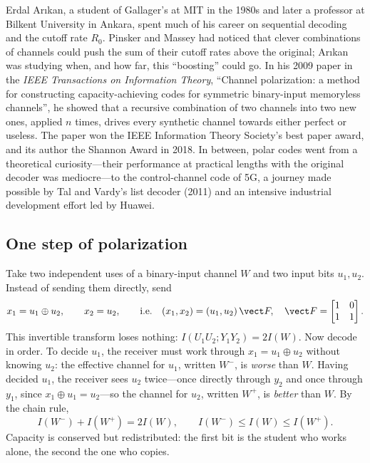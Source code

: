 \begin{history}
Erdal Ar\i kan, a student of Gallager's at MIT in the 1980s and later a professor at Bilkent
University in Ankara, spent much of his career on sequential decoding and the cutoff rate $R_0$.
Pinsker and Massey had noticed that clever combinations of channels could push the sum of their
cutoff rates above the original; Ar\i kan was studying when, and how far, this ``boosting'' could
go. In his 2009 paper in the \emph{IEEE Transactions on Information Theory}, ``Channel polarization:
a method for constructing capacity-achieving codes for symmetric binary-input memoryless channels'',
he showed that a recursive combination of two channels into two new ones, applied $n$ times, drives
every synthetic channel towards either perfect or useless. The paper won the IEEE Information Theory
Society's best paper award, and its author the Shannon Award in 2018. In between, polar codes went
from a theoretical curiosity---their performance at practical lengths with the original decoder was
mediocre---to the control-channel code of 5G, a journey made possible by Tal and Vardy's list
decoder (2011) and an intensive industrial development effort led by Huawei.
\end{history}

\subsection{One step of polarization}


Take two independent uses of a binary-input channel $W$ and two input bits $u_1,u_2$. Instead of
sending them directly, send
\begin{equation}
x_1=u_1\oplus u_2,\qquad x_2=u_2,
\qquad\text{i.e.}\quad (x_1,x_2)=(u_1,u_2)\,\vect F,\quad
\vect F=\begin{bmatrix}1&0\\1&1\end{bmatrix}.
\label{eq:ch15:F}
\end{equation}
This invertible transform loses nothing: $I(U_1U_2;Y_1Y_2)=2I(W)$. Now decode in order. To decide
$u_1$, the receiver must work through $x_1=u_1\oplus u_2$ without knowing $u_2$: the effective channel
for $u_1$, written $W^-$, is \emph{worse} than $W$. Having decided $u_1$, the receiver sees $u_2$
twice---once directly through $y_2$ and once through $y_1$, since $x_1\oplus u_1=u_2$---so the
channel for $u_2$, written $W^+$, is \emph{better} than $W$. By the chain rule,
\begin{equation}
I(W^-)+I(W^+)=2I(W),\qquad I(W^-)\le I(W)\le I(W^+).
\label{eq:ch15:conserve}
\end{equation}
Capacity is conserved but redistributed: the first bit is the student who works alone, the second
the one who copies.

